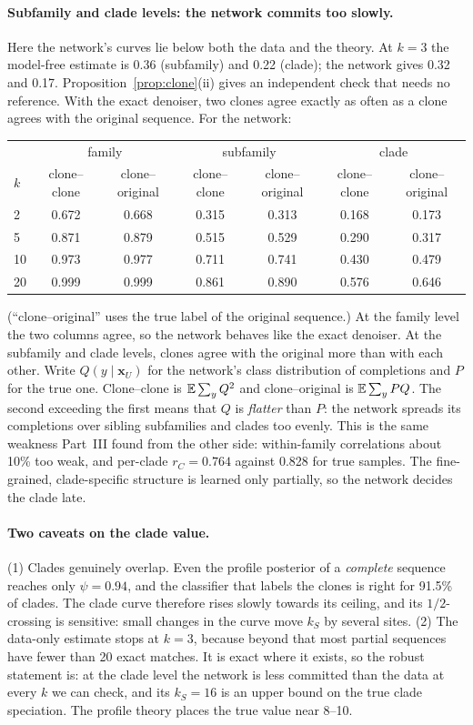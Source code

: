 \paragraph{Subfamily and clade levels: the network commits too slowly.} Here the network's curves lie below both the
data and the theory. At $k=3$ the model-free estimate is 0.36 (subfamily) and 0.22 (clade); the network gives 0.32 and
0.17. Proposition~\ref{prop:clone}(ii) gives an independent check that needs no reference. With the exact denoiser,
two clones agree exactly as often as a clone agrees with the original sequence. For the network:
\begin{center}\footnotesize
\begin{tabular}{lcccccc}
\toprule
 & \multicolumn{2}{c}{family} & \multicolumn{2}{c}{subfamily} & \multicolumn{2}{c}{clade}\\
$k$ & clone--clone & clone--original & clone--clone & clone--original & clone--clone & clone--original\\
\midrule
2 & 0.672 & 0.668 & 0.315 & 0.313 & 0.168 & 0.173\\
5 & 0.871 & 0.879 & 0.515 & 0.529 & 0.290 & 0.317\\
10 & 0.973 & 0.977 & 0.711 & 0.741 & 0.430 & 0.479\\
20 & 0.999 & 0.999 & 0.861 & 0.890 & 0.576 & 0.646\\
\bottomrule
\end{tabular}
\end{center}
(``clone--original'' uses the true label of the original sequence.) At the family level the two columns agree, so
the network behaves like the exact denoiser. At the subfamily and clade levels, clones agree with the original more
than with each other. Write $Q(y\mid\bm x_U)$ for the network's class distribution of completions and $P$ for the
true one. Clone--clone is $\mathbb{E}\sum_yQ^2$ and clone--original is $\mathbb{E}\sum_yPQ$. The second exceeding the first means
that $Q$ is \emph{flatter} than $P$: the network spreads its completions over sibling subfamilies and clades too
evenly. This is the same weakness Part~III found from the other side: within-family correlations about 10\% too weak,
and per-clade $r_C=0.764$ against 0.828 for true samples. The fine-grained, clade-specific structure is learned
only partially, so the network decides the clade late.

\paragraph{Two caveats on the clade value.} (1) Clades genuinely overlap. Even the profile posterior of a
\emph{complete} sequence reaches only $\psi=0.94$, and the classifier that labels the clones is right for 91.5\% of
clades. The clade curve therefore rises slowly towards its ceiling, and its $1/2$-crossing is sensitive: small
changes in the curve move $k_S$ by several sites. (2) The data-only estimate stops at $k=3$, because beyond that most
partial sequences have fewer than 20 exact matches. It is exact where it exists, so the robust statement is: at the
clade level the network is less committed than the data at every $k$ we can check, and its $k_S=16$ is an upper
bound on the true clade speciation. The profile theory places the true value near 8--10.

